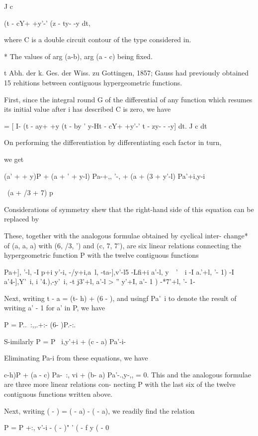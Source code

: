 J c

(t - cY+ +y'-' (z - ty- -y dt,

where C is a double circuit contour of the type considered in.

* The values of arg (a-b), arg (a - c) being fixed.

t Abh. der k. Ges. der Wiss. zu Gottingen, 1857; Gauss had previously
obtained 15 rehitions between contiguous hypergeometric functions.

%
%

First, since the integral round G of the differential of any function
which resumes its initial value after i has described C is zero, we
have

= [ I- (t - ay+ +y (t - by ' y-Ht - cY+ +y'-' t - zy- - -y] dt. J c dt

On performing the differentiation by differentiating each factor in
turn,

we get

(a' + + y)P + (a + ' + y-l) Pa-+,, '-, + (a + (3 + y'-l) Pa'+i,y-i

\ (a + /3 + 7) p

Considerations of symmetry shew that the right-hand side of this
equation can be replaced by

These, together with the analogous formulae obtained by cyclical
inter- change* of (a, a, a) with (6, /3, ') and (c, 7, 7'), are six
linear relations connecting the hypergeometric function P with the
twelve contiguous functions

Pa+], '-l, -I p+i y'-i, -/y+i,a\ l, -ta-],v'-l5 -Lfi+i a'-l, y~\, '~\
i -I a.'+l, '- 1) -I a'4-],Y'\ i, i '4.),-y'\ i, -t j3'+l, a'-l > ''
y'+I, a'- 1 ) -*7'+l, '- 1-

Next, writing t - a = (t- h) + (6 - ), and usingf Pa'\ i to denote the
result of writing a' - 1 for a' in P, we have

P = P..\ :,,.+:- (6- )P.-:.

S-imilarly P = P \ i,y'+i + (c - a) Pa'-i-

Eliminating Pa-i from these equations, we have

 c-h)P + (a - c) Pa-\ :, vi + (b- a) Pa'-.,y-,, = 0. This and the
analogous formulae are three more linear relations con- necting P with
the last six of the twelve contiguous functions written above.

Next, writing ( - ) = ( - a) - ( - a), we readily find the relation

P = P +:, v'-i - ( - )" ' ( - f y ( - 0

